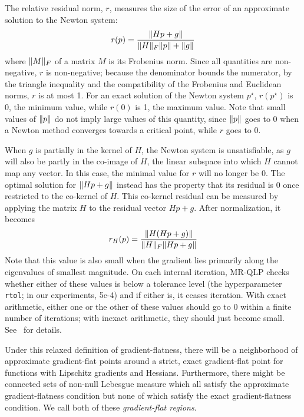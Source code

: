 \documentclass[../../thesis.tex]{subfiles}
\begin{document}
The relative residual norm, $r$,
measures the size of the error
of an approximate solution to the Newton system:
\begin{equation}
    r(p) = \frac{\lVert Hp + g\rVert}{\lVert H\rVert_F \lVert p\rVert + \lVert g\rVert}
\end{equation}
\noindent where $\lVert M\rVert_F$ of a matrix $M$ is its Frobenius norm.
Since all quantities are non-negative,
$r$ is non-negative;
because the denominator bounds the numerator,
by the triangle inequality and the compatibility
of the Frobenius and Euclidean norms,
$r$ is at most 1.
For an exact solution of the Newton system $p^\star$,
$r(p^\star)$ is 0, the minimum value,
while $r(0)$ is 1, the maximum value.
Note that small values of $\lVert p\rVert$
do not imply large values of this quantity,
since $\lVert p\rVert$ goes to 0 when a Newton method
converges towards a critical point,
while $r$ goes to 0.

When $g$ is partially in the kernel of $H$,
the Newton system is unsatisfiable,
as $g$ will also be partly in the co-image of $H$,
the linear subspace into which $H$ cannot map any vector.
In this case, the minimal value for $r$ will no longer be $0$.
The optimal solution for $\lVert Hp + g\rVert$
instead has the property that its residual
is $0$ once restricted to the co-kernel of $H$.
This co-kernel residual can be measured by applying the matrix $H$
to the residual vector $Hp + g$.
After normalization, it becomes
\begin{equation}
    r_H(p) = \frac{\lVert H(Hp + g)\rVert}{\lVert H\rVert_F \lVert Hp + g\rVert}
\end{equation}
\noindent Note that this value is also small when the gradient lies
primarily along the eigenvalues of smallest magnitude.
On each internal iteration, MR-QLP checks whether
either of these values is below a tolerance level
(the hyperparameter \texttt{rtol}; in our experiments, 5e-4)
and if either is, it ceases iteration.
With exact arithmetic,
either one or the other of these values
should go to 0 within a finite number of iterations;
with inexact arithmetic, they should just become small.
See~\cite{choi2011} for details.

Under this relaxed definition of gradient-flatness,
there will be a neighborhood of approximate gradient-flat points
around a strict, exact gradient-flat point
for functions with Lipschitz gradients and Hessians.
Furthermore, there might be connected sets of non-null Lebesgue measure
which all satisfy the approximate gradient-flatness condition
but none of which satisfy the exact gradient-flatness condition.
We call both of these \emph{gradient-flat regions}.
\end{document}
